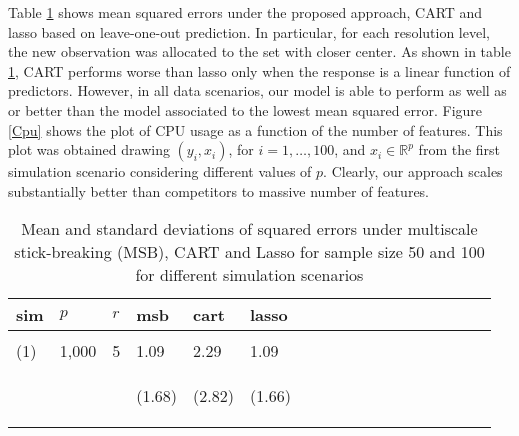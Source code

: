 \documentclass{article}
\newcommand{\Real}{\mathbb{R}}
\begin{document}
Table \ref{table1} shows mean squared errors under the proposed approach, CART and lasso based on leave-one-out prediction. In particular, for each resolution level, the new observation was allocated to the set with closer center. As shown in table \ref{table1}, CART performs worse than lasso only when the response is a linear function of predictors. However, in all data scenarios, our model is able to perform as well as or better than the model associated to the lowest mean squared error.  Figure \ref{Cpu} shows the plot of CPU usage as a function of the number of features. This plot was obtained drawing $(y_i, x_i)$, for $i=1, \ldots, 100$, and $x_i \in \Real^p$  from the first simulation scenario considering different values of $p$. Clearly, our approach scales substantially better than competitors to massive number of features.
\begin{table}[t]
\caption{Mean and standard deviations of squared errors under multiscale stick-breaking (MSB), CART and Lasso for sample size 50 and 100 for different simulation scenarios}
\label{table1} \vskip 0.15in \begin{center} \begin{small} \begin{sc}
\begin{tabular}{llllllllllllllllll}
\hline
\abovespace\belowspace
 sim&$p$&$r$& msb&cart&lasso\\
\hline
\\
(1)&1,000&5&     1.09 & 2.29 & 1.09\\
&& & \begin{scriptsize} (1.68)\end{scriptsize} & \begin{scriptsize} (2.82)\end{scriptsize}& \begin{scriptsize} (1.66)\end{scriptsize}\\


\end{tabular}
\end{sc}
\end{small}
\end{center}
\end{table}
\end{document}
